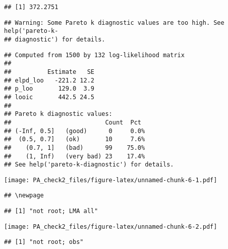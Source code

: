 \documentclass[12pt,]{article}
\begin{document}
\begin{verbatim}
## [1] 372.2751
\end{verbatim}

\begin{verbatim}
## Warning: Some Pareto k diagnostic values are too high. See help('pareto-k-
## diagnostic') for details.
\end{verbatim}

\begin{verbatim}
## Computed from 1500 by 132 log-likelihood matrix
## 
##          Estimate   SE
## elpd_loo   -221.2 12.2
## p_loo       129.0  3.9
## looic       442.5 24.5
## 
## Pareto k diagnostic values:
##                          Count  Pct 
## (-Inf, 0.5]   (good)      0     0.0%
##  (0.5, 0.7]   (ok)       10     7.6%
##    (0.7, 1]   (bad)      99    75.0%
##    (1, Inf)   (very bad) 23    17.4%
## See help('pareto-k-diagnostic') for details.
\end{verbatim}

\texttt{[image: PA\_check2\_files/figure-latex/unnamed-chunk-6-1.pdf]}

\begin{verbatim}
## \newpage
\end{verbatim}

\begin{verbatim}
## [1] "not root; LMA all"
\end{verbatim}

\texttt{[image: PA\_check2\_files/figure-latex/unnamed-chunk-6-2.pdf]}

\begin{verbatim}
## [1] "not root; obs"
\end{verbatim}
\end{document}
